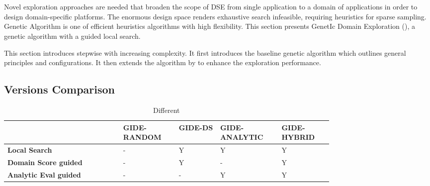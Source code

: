 \section{\ga}
\label{sec:GA}

Novel exploration approaches are needed that broaden the scope of DSE from single application to a domain of applications in order to design domain-specific platforms. The enormous design space renders exhaustive search infeasible, requiring heuristics for sparse sampling. Genetic Algorithm is one of efficient heuristics algorithms with high flexibility. This section presents GenetIc Domain Exploration (\ga), a genetic algorithm with a guided local search.





This section introduces \ga stepwise with increasing complexity. It first introduces the baseline genetic algorithm \emph{\garand} which outlines general principles and configurations. It then extends the algorithm by  to enhance the exploration performance. 






\subsection{\ga Versions Comparison}

\begin{table}[h]
	\caption{Different \ga {}}
	\label{tab:GIDE}
	\centering
	\begin{tabular}{p{0.29\linewidth}|p{0.12\linewidth}|p{0.1\linewidth}|p{0.13\linewidth}|p{0.12\linewidth}}
		\toprule
		   & GIDE-RANDOM & GIDE-DS  & GIDE-ANALYTIC & GIDE-HYBRID \\
		\hline
		\midrule
		\textbf{Local Search} & - & Y & Y & Y \\
		\hline
		\textbf{Domain Score guided} & - & Y & - & Y \\
		\hline
		\textbf{Analytic Eval guided} & - & - & Y & Y \\
		\bottomrule
	\end{tabular}
\end{table}

